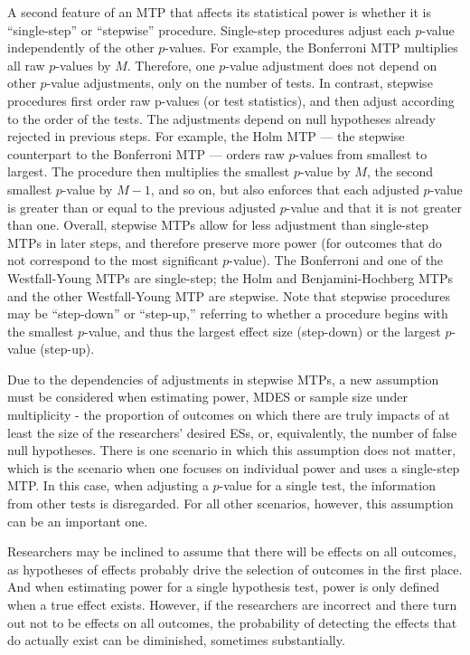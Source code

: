 \documentclass[
]{article}
\begin{document}
A second feature of an MTP that affects its statistical power is whether
it is ``single-step'' or ``stepwise'' procedure. Single-step procedures
adjust each \(p\)-value independently of the other \(p\)-values. For
example, the Bonferroni MTP multiplies all raw \(p\)-values by \(M\).
Therefore, one \(p\)-value adjustment does not depend on other
\(p\)-value adjustments, only on the number of tests. In contrast,
stepwise procedures first order raw p-values (or test statistics), and
then adjust according to the order of the tests. The adjustments depend
on null hypotheses already rejected in previous steps. For example, the
Holm MTP --- the stepwise counterpart to the Bonferroni MTP --- orders
raw \(p\)-values from smallest to largest. The procedure then multiplies
the smallest \(p\)-value by \(M\), the second smallest \(p\)-value by
\(M-1\), and so on, but also enforces that each adjusted \(p\)-value is
greater than or equal to the previous adjusted \(p\)-value and that it
is not greater than one. Overall, stepwise MTPs allow for less
adjustment than single-step MTPs in later steps, and therefore preserve
more power (for outcomes that do not correspond to the most significant
\(p\)-value). The Bonferroni and one of the Westfall-Young MTPs are
single-step; the Holm and Benjamini-Hochberg MTPs and the other
Westfall-Young MTP are stepwise. Note that stepwise procedures may be
``step-down'' or ``step-up,'' referring to whether a procedure begins
with the smallest \(p\)-value, and thus the largest effect size
(step-down) or the largest \(p\)-value (step-up).

Due to the dependencies of adjustments in stepwise MTPs, a new
assumption must be considered when estimating power, MDES or sample size
under multiplicity - the proportion of outcomes on which there are truly
impacts of at least the size of the researchers' desired ESs, or,
equivalently, the number of false null hypotheses. There is one scenario
in which this assumption does not matter, which is the scenario when one
focuses on individual power and uses a single-step MTP. In this case,
when adjusting a \(p\)-value for a single test, the information from
other tests is disregarded. For all other scenarios, however, this
assumption can be an important one.

Researchers may be inclined to assume that there will be effects on all
outcomes, as hypotheses of effects probably drive the selection of
outcomes in the first place. And when estimating power for a single
hypothesis test, power is only defined when a true effect exists.
However, if the researchers are incorrect and there turn out not to be
effects on all outcomes, the probability of detecting the effects that
do actually exist can be diminished, sometimes substantially.
\end{document}
